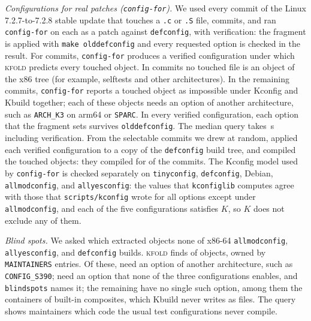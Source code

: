 \documentclass[acmsmall,screen,review]{acmart}
\newcommand{\tool}{\textsc{kfold}\xspace}
\begin{document}
\emph{Configurations for real patches (\texttt{config-for}).} We used every commit of the Linux 7.2.7-to-7.2.8 stable update that touches a \texttt{.c} or \texttt{.S} file, \NConfigforCommits commits, and ran \texttt{config-for} on each as a patch against \texttt{defconfig}, with verification: the fragment is applied with \texttt{make olddefconfig} and every requested option is checked in the result. For \NConfigforSelectable commits, \texttt{config-for} produces a verified configuration under which \tool predicts every touched object. In \NConfigforUnmapped commits no touched file is an object of the x86 tree (for example, selftests and other architectures). In the remaining \NConfigforExcluded commits, \texttt{config-for} reports a touched object as impossible under Kconfig and Kbuild together; each of these objects needs an option of another architecture, such as \texttt{ARCH\_K3} on arm64 or \texttt{SPARC}. In every verified configuration, each option that the fragment sets survives \texttt{olddefconfig}. The median query takes \NConfigforMedianSeconds\,s including verification. From the \NConfigforSelectable selectable commits we drew \NCompileSampled at random, applied each verified configuration to a copy of the \texttt{defconfig} build tree, and compiled the touched objects: they compiled for \NCompileOk of the \NCompileSampled commits. The Kconfig model used by \texttt{config-for} is checked separately on \texttt{tinyconfig}, \texttt{defconfig}, Debian, \texttt{allmodconfig}, and \texttt{allyesconfig}: the values that \texttt{kconfiglib} computes agree with those that \texttt{scripts/kconfig} wrote for all \NKconfigDefined options except \NKconfigMismatches under \texttt{allmodconfig}, and each of the five configurations satisfies $K$, so $K$ does not exclude any of them.

\emph{Blind spots.} We asked which extracted objects none of x86-64 \texttt{allmodconfig}, \texttt{allyesconfig}, and \texttt{defconfig} builds. \tool finds \NBlindBlindSpots of \NBlindObjectsConsidered objects, owned by \NBlindEntriesWithBlindSpots \texttt{MAINTAINERS} entries. Of these, \NBlindArch need an option of another architecture, such as \texttt{CONFIG\_S390}; \NBlindNotenabled need an option that none of the three configurations enables, and \texttt{blindspots} names it; the remaining \NBlindNopivot have no single such option, among them the containers of built-in composites, which Kbuild never writes as files. The query shows maintainers which code the usual test configurations never compile.
\end{document}
